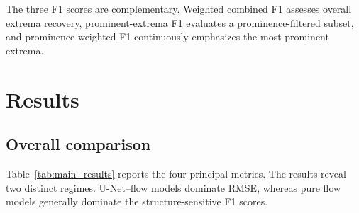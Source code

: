 \documentclass[11pt]{article}
\begin{document}
The three F1 scores are complementary. Weighted combined F1 assesses overall extrema recovery, prominent-extrema F1 evaluates a prominence-filtered subset, and prominence-weighted F1 continuously emphasizes the most prominent extrema.

\section{Results}

\subsection{Overall comparison}

Table~\ref{tab:main_results} reports the four principal metrics. The results reveal two distinct regimes. U-Net--flow models dominate RMSE, whereas pure flow models generally dominate the structure-sensitive F1 scores.
\end{document}
